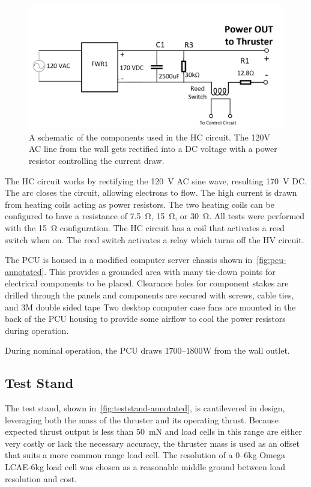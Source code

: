 \documentclass[journal]{IEEEtran}
\begin{document}
\begin{figure}[htp]
  \includegraphics[width=\linewidth]{figs/hc-schematic.png}
  \caption{A schematic of the components used in the HC circuit.
  The 120V AC line from the wall gets rectified into a DC voltage with a power resistor controlling the current draw.
\label{fig:hc-circuit}
}
\end{figure}

The HC circuit works by rectifying the \SI{120}{\volt} AC sine wave, resulting \SI{170}{\volt} DC.\@
The arc closes the circuit, allowing electrons to flow.
The high current is drawn from heating coils acting as power resistors.
The two heating coils can be configured to have a resistance of \SI{7.5}{\ohm}, \SI{15}{\ohm}, or \SI{30}{\ohm}.
All tests were performed with the \SI{15}{\ohm} configuration.
The HC circuit has a coil that activates a reed switch when on.
The reed switch activates a relay which turns off the HV circuit.

The PCU is housed in a modified computer server chassis shown in~\autoref{fig:pcu-annotated}.
This provides a grounded area with many tie-down points for electrical components to be placed.
Clearance holes for component stakes are drilled through the panels and components are secured with screws, cable ties, and 3M double sided tape
Two desktop computer case fans are mounted in the back of the PCU housing to provide some airflow to cool the power resistors during operation.

During nominal operation, the PCU draws $1700$--$1800$\si{\watt} from the wall outlet.

\subsection{Test Stand}
The test stand, shown in~\autoref{fig:teststand-annotated}, is cantilevered in design, leveraging both the mass of the thruster and its operating thrust.
Because expected thrust output is less than \SI{50}{\milli\newton} and load cells in this range are either very costly or lack the necessary accuracy, the thruster mass is used as an offset that suits a more common range load cell.
The resolution of a 0--6\si{\kilo\gram} Omega LCAE-6kg load cell was chosen as a reasonable middle ground between load resolution and cost.
\end{document}
